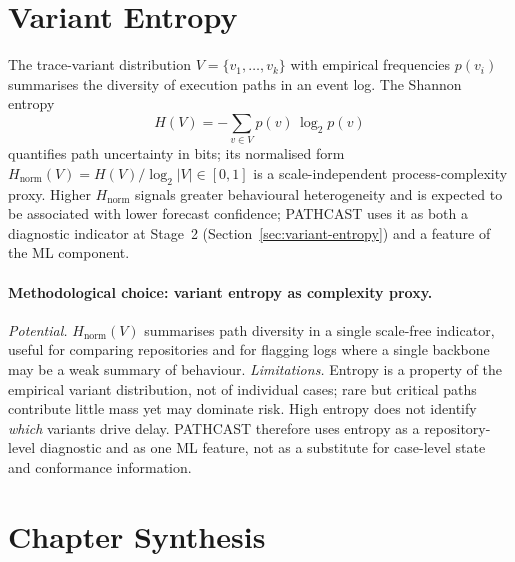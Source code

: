 \section{Variant Entropy}
\label{sec:variant-entropy-cap2}

The trace-variant distribution $V = \{v_1, \ldots, v_k\}$ with empirical
frequencies $p(v_i)$ summarises the diversity of execution paths in an
event log. The Shannon entropy
\begin{equation}
\label{eq:variant-entropy-cap2}
H(V) = - \sum_{v \in V} p(v)\, \log_2 p(v)
\end{equation}
quantifies path uncertainty in bits; its normalised form
$H_{\text{norm}}(V) = H(V) / \log_2 |V| \in [0,1]$ is a scale-independent
process-complexity proxy. Higher $H_{\text{norm}}$ signals greater
behavioural heterogeneity and is expected to be associated with lower
forecast confidence; PATHCAST uses it as both a diagnostic indicator at
Stage~2 (Section~\ref{sec:variant-entropy}) and a feature of the ML
component.

\paragraph{Methodological choice: variant entropy as complexity proxy.}
\emph{Potential.} $H_{\text{norm}}(V)$ summarises path diversity in a single
scale-free indicator, useful for comparing repositories and for flagging
logs where a single backbone may be a weak summary of behaviour.
\emph{Limitations.} Entropy is a property of the empirical variant
distribution, not of individual cases; rare but critical paths contribute
little mass yet may dominate risk. High entropy does not identify
\emph{which} variants drive delay. PATHCAST therefore uses entropy as a
repository-level diagnostic and as one ML feature, not as a substitute for
case-level state and conformance information.


\section{Chapter Synthesis}
\label{sec:ch2-synthesis}

